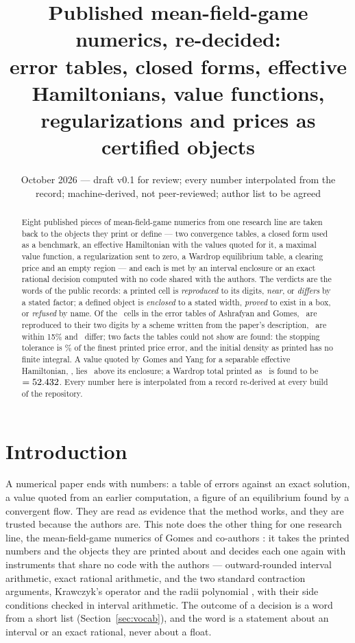 \documentclass[11pt]{article}
\title{Published mean-field-game numerics, re-decided:\\
error tables, closed forms, effective Hamiltonians, value functions,\\
regularizations and prices as certified objects}
\author{\cmauthor}
\date{October 2026 --- draft v0.1 for review; every number interpolated from the record; machine-derived, not peer-reviewed; author list to be agreed}
\begin{document}
\maketitle

\begin{abstract}
Eight published pieces of mean-field-game numerics from one research line are taken back to the objects they print or define --- two convergence tables, a closed form used as a benchmark, an effective Hamiltonian with the values quoted for it, a maximal value function, a regularization sent to zero, a Wardrop equilibrium table, a clearing price and an empty region --- and each is met by an interval enclosure or an exact rational decision computed with no code shared with the authors. The verdicts are the words of the public records: a printed cell is \emph{reproduced} to its digits, \emph{near}, or \emph{differs} by a stated factor; a defined object is \emph{enclosed} to a stated width, \emph{proved} to exist in a box, or \emph{refused} by name. Of the \AGCells\ cells in the error tables of Ashrafyan and Gomes, \AGReproduced\ are reproduced to their two digits by a scheme written from the paper's description, \AGNear\ are within 15\% and \AGDiffers\ differ; two facts the tables could not show are found: the stopping tolerance is \AGTolShare\% of the finest printed price error, and the initial density as printed has no finite integral. A value quoted by Gomes and Yang for a separable effective Hamiltonian, \HBCited, lies \HBCitedGap\ above its enclosure; a Wardrop total printed as \WDPrinted\ is found to be \WDErratumFrac\ $= 52.432$. Every number here is interpolated from a record re-derived at every build of the repository.
\end{abstract}

\section{Introduction}\label{sec:intro}

A numerical paper ends with numbers: a table of errors against an exact solution, a value quoted from an earlier computation, a figure of an equilibrium found by a convergent flow. They are read as evidence that the method works, and they are trusted because the authors are. This note does the other thing for one research line, the mean-field-game numerics of Gomes and co-authors \cite{AG25,AFG17,GY20,GU26,FGU26,BAdHG26,GS21,AAG26}: it takes the printed numbers and the objects they are printed about and decides each one again with instruments that share no code with the authors --- outward-rounded interval arithmetic, exact rational arithmetic, and the two standard contraction arguments, Krawczyk's operator \cite{Kr69} and the radii polynomial \cite{vdBL15,DLM07}, with their side conditions checked in interval arithmetic. The outcome of a decision is a word from a short list (Section~\ref{sec:vocab}), and the word is a statement about an interval or an exact rational, never about a float.
\end{document}
